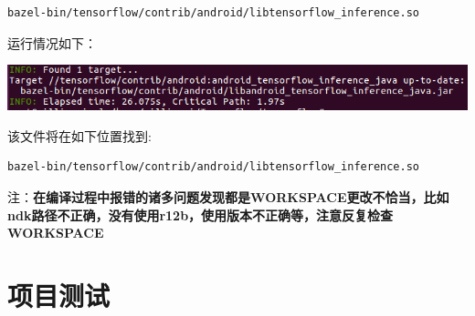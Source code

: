 \documentclass[UTF8, Microsoft YaHei]{book}
\begin{document}
    \begin{lstlisting}[language=bash]
    bazel-bin/tensorflow/contrib/android/libtensorflow_inference.so
    \end{lstlisting}

    运行情况如下：

    \includegraphics[width=1.0\textwidth]{img/TensorFlow-java编译.png}

    该文件将在如下位置找到:

    \begin{lstlisting}[language=bash]
    bazel-bin/tensorflow/contrib/android/libtensorflow_inference.so
    \end{lstlisting}

    注：\textbf{在编译过程中报错的诸多问题发现都是WORKSPACE更改不恰当，比如ndk路径不正确，没有使用r12b，使用版本不正确等，注意反复检查WORKSPACE}

    \chapter{项目测试}
\end{document}
